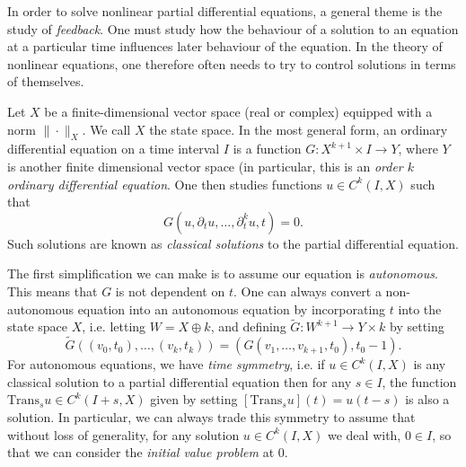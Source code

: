 In order to solve nonlinear partial differential equations, a general theme is the study of \emph{feedback}. One must study how the behaviour of a solution to an equation at a particular time influences later behaviour of the equation. In the theory of nonlinear equations, one therefore often needs to try to control solutions in terms of themselves.

Let $X$ be a finite-dimensional vector space (real or complex) equipped with a norm $\| \cdot \|_X$. We call $X$ the state space. In the most general form, an ordinary differential equation on a time interval $I$ is a function $G: X^{k+1} \times I \to Y$, where $Y$ is another finite dimensional vector space (in particular, this is an \emph{order $k$ ordinary differential equation}. One then studies functions $u \in C^k(I,X)$ such that
%
\[ G(u,\partial_t u, \dots, \partial_t^k u,t) = 0. \]
%
Such solutions are known as \emph{classical solutions} to the partial differential equation.

The first simplification we can make is to assume our equation is \emph{autonomous}. This means that $G$ is not dependent on $t$. One can always convert a non-autonomous equation into an autonomous equation by incorporating $t$ into the state space $X$, i.e. letting $W = X \oplus k$, and defining $\tilde{G}: W^{k+1} \to Y \times k$ by setting
%
\[ \tilde{G}((v_0,t_0),\dots,(v_k,t_k)) = (G(v_1,\dots,v_{k+1},t_0),t_0 - 1). \]
%
For autonomous equations, we have \emph{time symmetry}, i.e. if $u \in C^k(I,X)$ is any classical solution to a partial differential equation then for any $s \in I$, the function $\text{Trans}_s u \in C^k(I + s,X)$ given by setting $[\text{Trans}_s u](t) = u(t - s)$ is also a solution. In particular, we can always trade this symmetry to assume that without loss of generality, for any solution $u \in C^k(I,X)$ we deal with, $0 \in I$, so that we can consider the \emph{initial value problem} at $0$.

